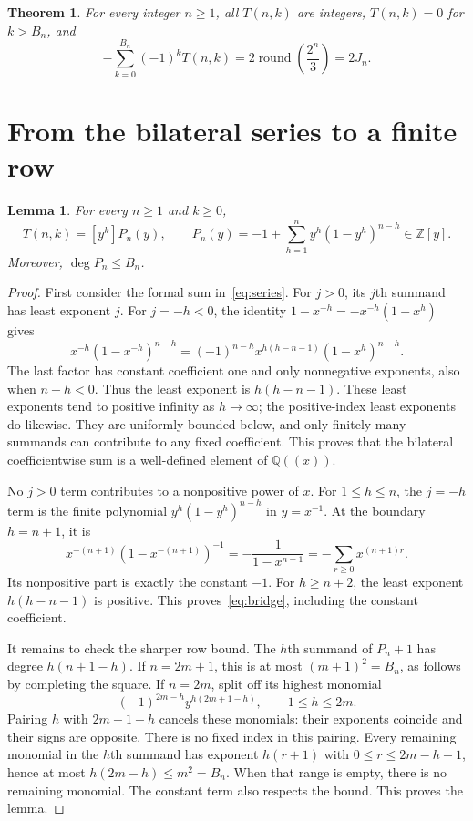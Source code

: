 \documentclass[11pt]{article}
\newtheorem{theorem}{Theorem}
\newtheorem{lemma}{Lemma}
\newcommand{\Z}{\mathbb Z}
\newcommand{\Q}{\mathbb Q}
\newcommand{\round}{\operatorname{round}}
\begin{document}
\begin{theorem}\label{thm:main}
For every integer $n\geq1$, all $T(n,k)$ are integers, $T(n,k)=0$ for
$k>B_n$, and
\begin{equation}\label{eq:main}
 -\sum_{k=0}^{B_n}(-1)^k T(n,k)
 =2\round\!\left(\frac{2^n}{3}\right)=2J_n.
\end{equation}
\end{theorem}

\section{From the bilateral series to a finite row}

\begin{lemma}\label{lem:row}
For every $n\geq1$ and $k\geq0$,
\begin{equation}\label{eq:bridge}
 T(n,k)=[y^k]P_n(y),\qquad
 P_n(y)=-1+\sum_{h=1}^{n}y^h(1-y^h)^{n-h}\in\Z[y].
\end{equation}
Moreover, $\deg P_n\leq B_n$.
\end{lemma}

\begin{proof}
First consider the formal sum in~\eqref{eq:series}. For $j>0$, its $j$th
summand has least exponent $j$. For $j=-h<0$, the identity
$1-x^{-h}=-x^{-h}(1-x^h)$ gives
\begin{equation}\label{eq:normal}
 x^{-h}(1-x^{-h})^{n-h}
 =(-1)^{n-h}x^{h(h-n-1)}(1-x^h)^{n-h}.
\end{equation}
The last factor has constant coefficient one and only nonnegative
exponents, also when $n-h<0$. Thus the least exponent is $h(h-n-1)$.
These least exponents tend to positive infinity as $h\to\infty$;
the positive-index least exponents do likewise. They are uniformly
bounded below, and only finitely many summands can contribute to any fixed
coefficient. This proves that the bilateral coefficientwise sum is a
well-defined element of $\Q((x))$.

No $j>0$ term contributes to a nonpositive power of $x$. For $1\leq h\leq n$,
the $j=-h$ term is the finite polynomial
$y^h(1-y^h)^{n-h}$ in $y=x^{-1}$.
At the boundary $h=n+1$, it is
\[
 x^{-(n+1)}(1-x^{-(n+1)})^{-1}
 =-\frac{1}{1-x^{n+1}}
 =-\sum_{r\geq0}x^{(n+1)r}.
\]
Its nonpositive part is exactly the constant $-1$.
For $h\geq n+2$, the least exponent $h(h-n-1)$ is positive.
This proves~\eqref{eq:bridge}, including the constant coefficient.

It remains to check the sharper row bound. The $h$th summand of $P_n+1$
has degree $h(n+1-h)$. If $n=2m+1$, this is at most $(m+1)^2=B_n$,
as follows by completing the square.
If $n=2m$, split off its highest monomial
\[
 (-1)^{2m-h}y^{h(2m+1-h)},\qquad 1\leq h\leq2m.
\]
Pairing $h$ with $2m+1-h$ cancels these monomials: their exponents
coincide and their signs are opposite. There is no fixed index in this
pairing. Every remaining monomial in the $h$th summand has exponent
$h(r+1)$ with $0\leq r\leq2m-h-1$, hence at most
$h(2m-h)\leq m^2=B_n$. When that range is empty, there is no remaining
monomial. The constant term also respects the bound. This proves the lemma.
\end{proof}
\end{document}
